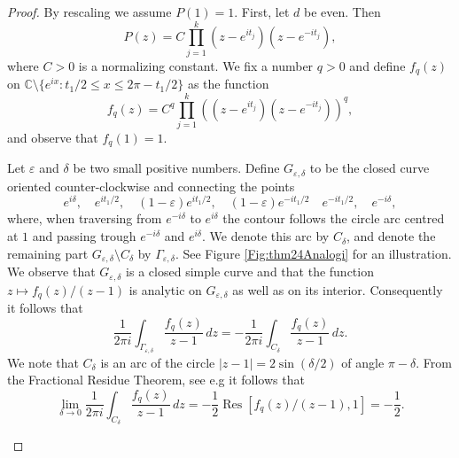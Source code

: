 \documentclass{amsart}
\theoremstyle{plain}
\theoremstyle{remark}
\DeclareMathOperator{\Res}{Res}
\begin{document}
	\begin{proof}
		By rescaling we assume $P(1)=1$. First, let $d$ be even. Then 
		\[P(z)=C\prod_{j=1}^{k}(z-e^{it_j})(z-e^{-it_j}),\] where $C>0$ is a normalizing constant. We fix a number $q>0$ and define $f_q(z)$ on  $\mathbb{C}\setminus \{e^{i x} : t_1/2 \leq x \leq 2\pi-t_1/2\}$ as the function
		\[f_q(z)=C^q\prod_{j=1}^{k}((z-e^{it_j})(z-e^{-it_j}))^q,\]
		and observe that $f_q(1)=1$.
		
		Let $\varepsilon$ and $\delta$ be two small positive numbers. Define $G_{\varepsilon, \delta}$ to be the closed curve oriented counter-clockwise and connecting the points 
		\[ e^{i \delta}, \quad e^{i t_1/2}, \quad (1-\varepsilon) e^{i t_1/2}, \quad (1-\varepsilon) e^{-i t_1/2} \quad e^{-i t_1/2}, \quad e^{-i \delta}, \] where, when traversing from $e^{-i \delta}$ to $e^{i \delta}$ the contour follows the circle arc centred at $1$ and passing trough $e^{-i \delta}$ and $e^{i \delta}$. We denote this arc by $C_\delta$, and denote the remaining part $G_{\varepsilon, \delta} \setminus C_\delta$ by $\Gamma_{ \varepsilon, \delta}$. See Figure \ref{Fig:thm24Analogi} for an illustration. We observe that $G_{\varepsilon, \delta}$ is a closed simple curve and that the function $z \mapsto f_q(z)/(z-1)$ is analytic on $G_{\varepsilon, \delta}$ as well as on its interior. Consequently it follows that 
		\[\frac{1}{2 \pi i } \int_{\Gamma_{\varepsilon, \delta}} \frac{f_q(z)}{z-1} \, dz = - \frac{1}{2 \pi i } \int_{C_\delta} \frac{f_q(z)}{z-1} \, dz . \]
		We note that  $C_\delta$ is an arc of the circle $|z-1|=2 \sin(\delta/2)$ of angle $\pi-\delta$. From the Fractional Residue Theorem, see e.g \cite[page 209]{Gamelin} it follows that 
		\[\lim_{\delta \to 0} \frac{1}{2 \pi i} \int_{C_\delta} \frac{f_q(z)}{z-1} \, dz = -\frac{1}{2} \Res[f_q(z)/(z-1), 1]=-\frac{1}{2}.\]
		\begin{figure}
\end{figure}
\end{proof}
\end{document}
